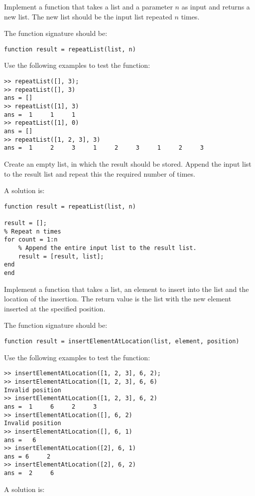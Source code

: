 \begin{ex}
Implement a function that takes a list and a parameter $n$ as 
input and returns a new list.
The new list should be the input list repeated $n$ times.

The function signature should be:
\begin{lstlisting}
function result = repeatList(list, n)
\end{lstlisting}
Use the following examples to test the function:
\begin{lstlisting}
>> repeatList([], 3);
>> repeatList([], 3)
ans = []
>> repeatList([1], 3)
ans =  1     1     1
>> repeatList([1], 0)
ans = []
>> repeatList([1, 2, 3], 3)
ans =  1     2     3     1     2     3     1     2     3
\end{lstlisting}
\begin{hint}
Create an empty list, in which the result should be stored.
Append the input list to the result list and repeat this 
the required number of times.
\end{hint}
\begin{sol}
A solution is:
\begin{lstlisting}
function result = repeatList(list, n)

result = [];
% Repeat n times
for count = 1:n
    % Append the entire input list to the result list.
    result = [result, list];
end
end
\end{lstlisting}
\end{sol}
\end{ex}



\begin{ex}
Implement a function that takes a list, an element to insert into the list and the location of the insertion.
The return value is the list with the new element inserted at the specified position.

The function signature should be:
\begin{lstlisting}
function result = insertElementAtLocation(list, element, position)
\end{lstlisting}
Use the following examples to test the function:
\begin{lstlisting}
>> insertElementAtLocation([1, 2, 3], 6, 2);
>> insertElementAtLocation([1, 2, 3], 6, 6)
Invalid position
>> insertElementAtLocation([1, 2, 3], 6, 2)
ans =  1     6     2     3
>> insertElementAtLocation([], 6, 2)
Invalid position
>> insertElementAtLocation([], 6, 1)
ans =   6
>> insertElementAtLocation([2], 6, 1)
ans = 6     2
>> insertElementAtLocation([2], 6, 2)
ans =  2     6
\end{lstlisting}
\begin{hint}
\end{hint}
\begin{sol}
A solution is:
\begin{lstlisting}
\end{lstlisting}
\end{sol}
\end{ex}


